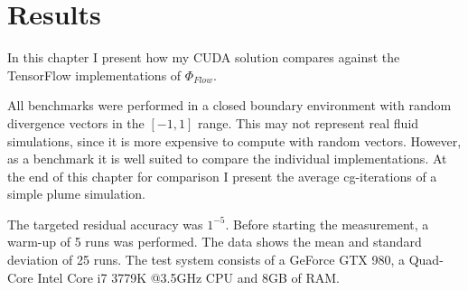 \chapter{Results}\label{chapter:results}

In this chapter I present how my CUDA solution compares against the TensorFlow implementations of $\Phi_{Flow}$.
\par All benchmarks were performed in a closed boundary environment with random divergence vectors in the $\left[-1, 1 \right]$ range. This may not represent real fluid simulations, since it is more expensive to compute with random vectors. However, as a benchmark it is well suited to compare the individual implementations. At the end of this chapter for comparison I present the average cg-iterations of a simple plume simulation.
\par The targeted residual accuracy was $1^{-5}$. Before starting the measurement, a warm-up of 5 runs was performed. The data shows the mean and standard deviation of 25 runs. The test system consists of a GeForce GTX 980, a Quad-Core Intel Core i7 3779K @3.5GHz CPU and 8GB of RAM.

